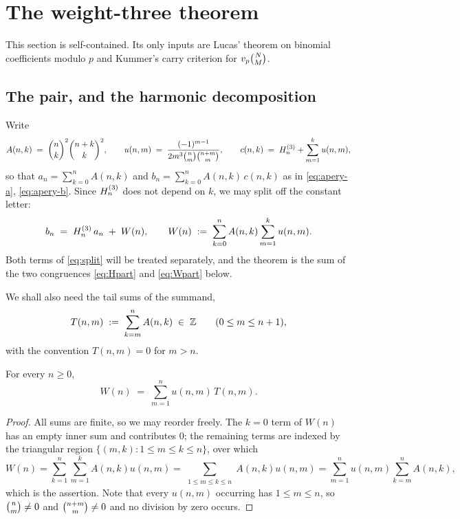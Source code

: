 \section{The weight-three theorem}
\label{sec:weight3}

This section is self-contained. Its only inputs are Lucas' theorem on binomial
coefficients modulo $p$ and Kummer's carry criterion for $v_p\binom{N}{M}$.

\subsection{The pair, and the harmonic decomposition}

Write
\begin{equation}\label{eq:Ank}
   A(n,k)\;=\;\binom{n}{k}^2\binom{n+k}{k}^2,
   \qquad
   u(n,m)\;=\;\frac{(-1)^{m-1}}{2m^3\binom{n}{m}\binom{n+m}{m}},
   \qquad
   c(n,k)\;=\;H^{(3)}_{n}+\sum_{m=1}^{k}u(n,m),
\end{equation}
so that $a_n=\sum_{k=0}^nA(n,k)$ and $b_n=\sum_{k=0}^nA(n,k)\,c(n,k)$ as in
\eqref{eq:apery-a}, \eqref{eq:apery-b}. Since $H^{(3)}_{n}$ does not depend on $k$, we may split
off the constant letter:
\begin{equation}\label{eq:split}
   b_n\;=\;H^{(3)}_{n}\,a_n\;+\;W(n),
   \qquad
   W(n)\;:=\;\sum_{k=0}^{n}A(n,k)\sum_{m=1}^{k}u(n,m).
\end{equation}
Both terms of \eqref{eq:split} will be treated separately, and the theorem is the sum of
the two congruences \eqref{eq:Hpart} and \eqref{eq:Wpart} below.

We shall also need the tail sums of the summand,
\begin{equation}\label{eq:Tdef}
  T(n,m)\;:=\;\sum_{k=m}^{n}A(n,k)\;\in\;\mathbb{Z}\qquad(0\le m\le n+1),
\end{equation}
with the convention $T(n,m)=0$ for $m>n$.

\begin{lemma}[interchange]\label{lem:interchange}
For every $n\ge0$,
\[
  W(n)\;=\;\sum_{m=1}^{n}u(n,m)\,T(n,m).
\]
\end{lemma}

\begin{proof}
All sums are finite, so we may reorder freely. The $k=0$ term of $W(n)$ has an empty inner
sum and contributes $0$; the remaining terms are indexed by the triangular region
$\{(m,k):1\le m\le k\le n\}$, over which
\[
  W(n)=\sum_{k=1}^{n}\sum_{m=1}^{k}A(n,k)u(n,m)
       =\sum_{\substack{1\le m\le k\le n}}A(n,k)u(n,m)
       =\sum_{m=1}^{n}u(n,m)\sum_{k=m}^{n}A(n,k),
\]
which is the assertion. Note that every $u(n,m)$ occurring has $1\le m\le n$, so
$\binom{n}{m}\ne0$ and $\binom{n+m}{m}\ne0$ and no division by zero occurs.
\end{proof}

